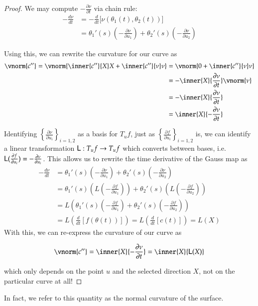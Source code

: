 \begin{proof}
		We may compute $-\frac{\partial \nu}{\partial t}$ via chain rule:
		\begin{align}
		-\frac{d \nu}{dt} &= -\frac{d}{dt}\big[\nu(\theta_1(t), \theta_2(t))\big] \\
		&= \theta_1'(s)\left( - \frac{\partial \nu}{\partial u_1} \right) + 
		\theta_2'(s)\left( - \frac{\partial \nu}{\partial u_2} \right)
		\end{align}
		
		Using this, we can rewrite the curvature for our curve as
		\begin{align}
		\vnorm{c''} = \vnorm{\inner{c''}{X} X + \inner{c''}{\nu}\nu}
		&= \vnorm{0 + \inner{c''}{\nu}\nu} \\
		&= - \inner{X}{\frac{\partial \nu}{\partial t}}\vnorm{\nu} \\
		&= - \inner{X}{\frac{\partial \nu}{\partial t}} \\
		&=  \inner{X}{-\frac{\partial \nu}{\partial t}}
		\end{align}
		
		
		Identifying $\left\{ \frac{\partial \nu}{\partial u_i}\right\}_{i=1,2}$ as a basis for $T_u f$, just as $\left\{ \frac{\partial f}{\partial u_i}\right\}_{i=1,2}$ is, we can identify a linear transformation $\mathsf{L}: T_u f \to T_u f$ which converts between bases, i.e.
		$\mathsf{L}(\frac{\partial f}{\partial u_i}) = - \frac{\partial \nu}{\partial u_i}$. This allows us to rewrite the time derivative of the Gauss map as
			\begin{align}
			-\frac{d \nu}{dt} &= 
			\theta_1'(s)\left( - \frac{\partial \nu}{\partial u_1} \right) + 
			\theta_2'(s)\left( - \frac{\partial \nu}{\partial u_2} \right) \\
			&= \theta_1'(s)\left( L\left(- \frac{\partial f}{\partial u_1}\right) \right) + 
			\theta_2'(s)\left( L\left(- \frac{\partial f}{\partial u_2}\right) \right) \\
			&= L\left(\theta_1'(s)\left( - \frac{\partial f}{\partial u_1}\right)  + 
			\theta_2'(s)\left( - \frac{\partial f}{\partial u_2} \right)\right) \\
			&= L\left( \frac{d}{dt}\left[ f\left(\theta(t)\right)\right] \right)
			= L\left( \frac{d}{dt} \left[ c(t) \right] \right) = L\left(X\right)
			\end{align} 
			With this, we can re-express the curvature of our curve as
			
			\begin{equation}
			\vnorm{c''} = \inner{X}{-\frac{\partial \nu}{\partial t}} = \inner{X}{\wein(X)}
			\end{equation}
			
			which only depends on the point $u$ and the selected direction $X$, not on the particular curve at all! 
		\end{proof}
		In fact, we refer to this quantity as the normal curvature of the surface. 
		
